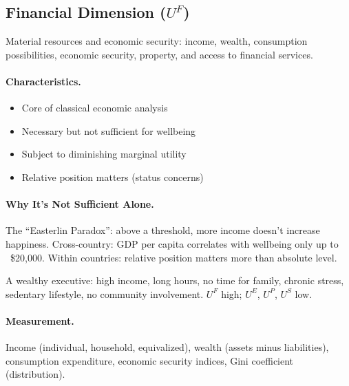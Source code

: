 \subsection{Financial Dimension ($U^F$)}
\label{sec:fepsde-financial}

\begin{definition}
Material resources and economic security: income, wealth, consumption possibilities,
economic security, property, and access to financial services.
\end{definition}

\paragraph{Characteristics.}
\begin{itemize}[nosep]
  \item Core of classical economic analysis
  \item Necessary but not sufficient for wellbeing
  \item Subject to diminishing marginal utility
  \item Relative position matters (status concerns)
\end{itemize}

\paragraph{Why It's Not Sufficient Alone.}
The ``Easterlin Paradox'': above a threshold, more income doesn't increase happiness.
Cross-country: GDP per capita correlates with wellbeing only up to ~\$20,000.
Within countries: relative position matters more than absolute level.

\begin{intuition}
A wealthy executive: high income, long hours, no time for family,
chronic stress, sedentary lifestyle, no community involvement.
$U^F$ high; $U^E$, $U^P$, $U^S$ low.
\end{intuition}

\paragraph{Measurement.}
Income (individual, household, equivalized), wealth (assets minus liabilities),
consumption expenditure, economic security indices, Gini coefficient (distribution).

